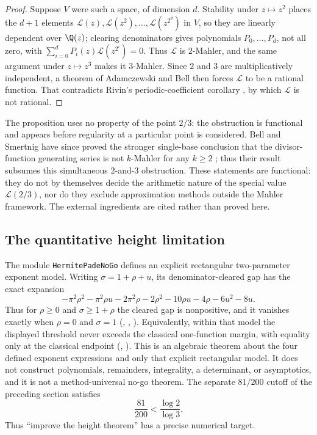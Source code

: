 \begin{proof}
Suppose $V$ were such a space, of dimension $d$.  Stability under $z\mapsto z^2$
places the $d+1$ elements $\mathcal L(z),\mathcal L(z^2),\dots,\mathcal
L(z^{2^{d}})$ in $V$, so they are linearly dependent over $\Q(z)$; clearing
denominators gives polynomials $P_0,\dots,P_d$, not all zero, with
$\sum_{i=0}^{d}P_i(z)\mathcal L(z^{2^i})=0$.  Thus $\mathcal L$ is $2$-Mahler,
and the same argument under $z\mapsto z^3$ makes it $3$-Mahler.  Since $2$ and
$3$ are multiplicatively independent, a theorem of Adamczewski and Bell
\cite[Theorem~1]{adamczewskibell2013} then forces $\mathcal L$ to be a rational
function.  That contradicts Rivin's periodic-coefficient corollary
\cite[Cor.~6.4, p.~9]{rivin2026}, by which $\mathcal L$ is not rational.
\end{proof}

The proposition uses no property of the point $2/3$: the obstruction is
functional and appears before regularity at a particular point is considered.
Bell and Smertnig have since proved the stronger single-base conclusion that
the divisor-function generating series is not $k$-Mahler for any $k\ge2$
\cite{bellsmertnig2026}; thus their result subsumes this simultaneous
$2$-and-$3$ obstruction.  These statements are functional: they do not by
themselves decide the arithmetic nature of the special value
$\mathcal L(2/3)$, nor do they exclude approximation methods outside the
Mahler framework.  The external ingredients are cited rather than proved here.

\subsection{The quantitative height limitation}

The module \texttt{HermitePadeNoGo} defines an explicit rectangular
two-parameter exponent model.  Writing $\sigma=1+\rho+u$, its
denominator-cleared gap has the exact expansion
\[
 -\pi^2\rho^2-\pi^2\rho u-2\pi^2\rho-2\rho^2-10\rho u
 -4\rho-6u^2-8u.
\]
Thus for $\rho\ge0$ and $\sigma\ge1+\rho$ the cleared gap is nonpositive, and
it vanishes exactly when $\rho=0$ and $\sigma=1$
(,
,
).
Equivalently, within that model the displayed threshold never exceeds the
classical one-function margin, with equality only at the classical endpoint
(,
).
This is an algebraic theorem about the four defined exponent expressions and
only that explicit rectangular model.  It does not construct polynomials,
remainders, integrality, a determinant, or asymptotics, and it is not a
method-universal no-go theorem.
The separate $81/200$ cutoff of the preceding section satisfies
\[
 \frac{81}{200}<\frac{\log2}{\log3}.
\]
Thus “improve the height theorem” has a precise numerical target.

